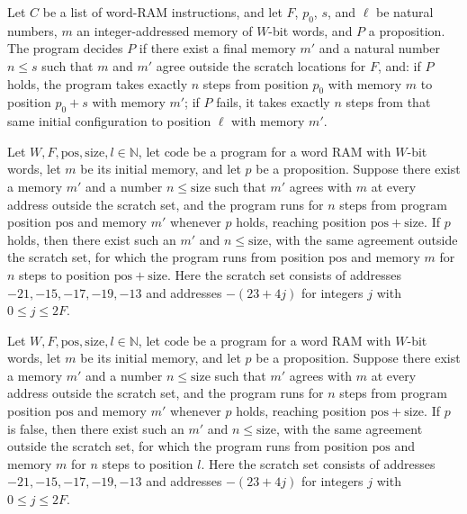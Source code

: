 \begin{definition}
\label{Light.Compiler.Decides}
\leanok
{}
Let $C$ be a list of word-RAM instructions, and let $F$, $p_0$, $s$, and $\ell$ be
natural numbers, $m$ an integer-addressed memory of $W$-bit words, and $P$ a
proposition. The program decides $P$ if there exist a final memory $m'$ and a natural
number $n\le s$ such that $m$ and $m'$ agree outside the scratch locations for $F$, and:
if $P$ holds, the program takes exactly $n$ steps from position $p_0$ with memory $m$ to
position $p_0+s$ with memory $m'$; if $P$ fails, it takes exactly $n$ steps from that
same initial configuration to position $\ell$ with memory $m'$.
\end{definition}

\begin{theorem}
\label{Light.Compiler.Decides.of_holds}
\leanok
{}
Let $W,F,\mathrm{pos},\mathrm{size},l\in\mathbb{N}$, let $\mathrm{code}$ be a program
for a word RAM with $W$-bit words, let $m$ be its initial memory, and let $p$ be a
proposition. Suppose there exist a memory $m'$ and a number $n\le\mathrm{size}$ such
that $m'$ agrees with $m$ at every address outside the scratch set, and the program runs
for $n$ steps from program position $\mathrm{pos}$ and memory $m'$ whenever $p$ holds,
reaching position $\mathrm{pos}+\mathrm{size}$. If $p$ holds, then there exist such an
$m'$ and $n\le\mathrm{size}$, with the same agreement outside the scratch set, for which
the program runs from position $\mathrm{pos}$ and memory $m$ for $n$ steps to position
$\mathrm{pos}+\mathrm{size}$. Here the scratch set consists of addresses
$-21,-15,-17,-19,-13$ and addresses $-(23+4j)$ for integers $j$ with $0\le j\le 2F$.
\end{theorem}

\begin{theorem}
\label{Light.Compiler.Decides.of_fails}
\leanok
{}
Let $W,F,\mathrm{pos},\mathrm{size},l\in\mathbb{N}$, let $\mathrm{code}$ be a program
for a word RAM with $W$-bit words, let $m$ be its initial memory, and let $p$ be a
proposition. Suppose there exist a memory $m'$ and a number $n\le\mathrm{size}$ such
that $m'$ agrees with $m$ at every address outside the scratch set, and the program runs
for $n$ steps from program position $\mathrm{pos}$ and memory $m'$ whenever $p$ holds,
reaching position $\mathrm{pos}+\mathrm{size}$. If $p$ is false, then there exist such
an $m'$ and $n\le\mathrm{size}$, with the same agreement outside the scratch set, for
which the program runs from position $\mathrm{pos}$ and memory $m$ for $n$ steps to
position $l$. Here the scratch set consists of addresses $-21,-15,-17,-19,-13$ and
addresses $-(23+4j)$ for integers $j$ with $0\le j\le 2F$.
\end{theorem}

